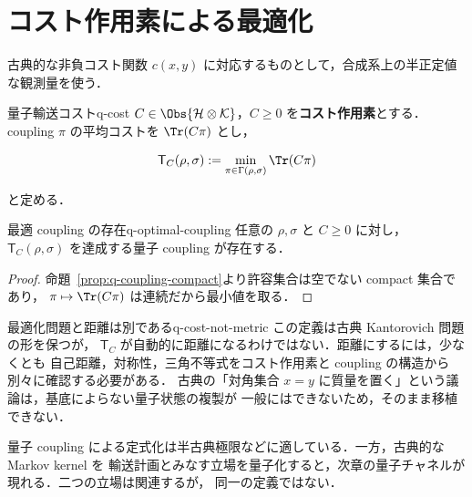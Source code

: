 \section{コスト作用素による最適化}

古典的な非負コスト関数 $c(x,y)$ に対応するものとして，合成系上の半正定値な観測量を使う．

\begin{definition}{量子輸送コスト}{q-cost}
  $C\in\Obs{\mathcal{H}\otimes\mathcal{K}}$，$C\geq0$ を\textbf{コスト作用素}とする．
  coupling $\pi$ の平均コストを $\Tr(C\pi)$ とし，

  \[
    \mathsf{T}_C(\rho,\sigma)
    :=\min_{\pi\in\Gamma(\rho,\sigma)}\Tr(C\pi)
  \]

  と定める．
\end{definition}

\begin{proposition}{最適 coupling の存在}{q-optimal-coupling}
  任意の $\rho,\sigma$ と $C\geq0$ に対し，
  $\mathsf{T}_C(\rho,\sigma)$ を達成する量子 coupling が存在する．
\end{proposition}

\begin{proof}
  命題~\ref{prop:q-coupling-compact}より許容集合は空でない compact 集合であり，
  $\pi\mapsto\Tr(C\pi)$ は連続だから最小値を取る．
\end{proof}

\begin{remark}{最適化問題と距離は別である}{q-cost-not-metric}
  この定義は古典 Kantorovich 問題の形を保つが，
  $\mathsf{T}_C$ が自動的に距離になるわけではない．距離にするには，少なくとも
  自己距離，対称性，三角不等式をコスト作用素と coupling の構造から別々に確認する必要がある．
  古典の「対角集合 $x=y$ に質量を置く」という議論は，基底によらない量子状態の複製が
  一般にはできないため，そのまま移植できない．
\end{remark}

量子 coupling による定式化は半古典極限などに適している．一方，古典的な Markov kernel を
輸送計画とみなす立場を量子化すると，次章の量子チャネルが現れる．二つの立場は関連するが，
同一の定義ではない．
